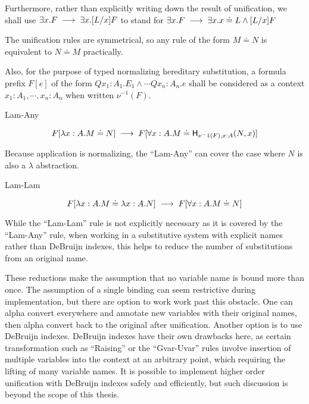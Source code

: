 Furthermore, rather than explicitly writing down the result of unification, 
we shall use $\exists x. F \;\longrightarrow\; \exists x . [ L / x] F$ 
to stand for $\exists x. F \;\longrightarrow\; \exists x . x \doteq L \wedge [ L / x] F$

The unification rules are symmetrical, so any rule of the form 
$M \doteq N$ is equivalent to $N \doteq M$ practically.

Also, for the purpose of typed normalizing hereditary substitution, 
a formula prefix $F[e]$ of the form 
$Qx_1:A_1 . E_1\wedge \cdots Qx_n : A_n . e$ shall be considered as a context
$x_1 : A_1 ,\cdots ,x_n : A_n$ when written $\nu^{-1}(F)$.

\setcounter{tcase}{0}

\begin{tcase}
Lam-Any
\end{tcase}

\[
F[\lambda x : A . M \doteq N]
\;\longrightarrow\;
F[\forall x : A . M \doteq \mathsf{H}_{\nu^-1(F),x:A}(N , x)]
\]

Because application is normalizing, the ``Lam-Any'' can cover the case where $N$ is also a $\lambda$ 
abstraction.

\begin{tcase}
Lam-Lam
\end{tcase}

\[
F[\lambda x : A . M \doteq \lambda x : A . N ]
\;\longrightarrow\;
F[ \forall x : A . M \doteq N ]
\]

While the ``Lam-Lam'' rule is not explicitly necessary as it is covered by the ``Lam-Any'' rule, 
when working
in a substitutive system with explicit names rather than DeBruijn indexes, 
this helps to reduce the number of substitutions from an original name. 

These reductions make the 
assumption that no variable name is bound more than once.
The assumption of a single binding can seem restrictive during implementation, but there are option to work
work past this obstacle.  One can alpha convert everywhere and annotate
new variables with their original names, then alpha convert
back to the original after unification. Another option is
to use DeBruijn indexes.  DeBruijn indexes have their own drawbacks
here, as certain transformation such as ``Raising''
or the ``Gvar-Uvar'' rules involve insertion of multiple
variables into the context at an arbitrary point, 
which requiring the lifting of many variable names.  
It is possible to implement higher order unification
with DeBruijn indexes safely and efficiently, 
but such discussion is beyond the scope of this thesis.

